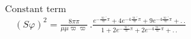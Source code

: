 \[
\begin{gathered}\text{Constant term}\quad
\\[7pt]\quad{}(S\varphi)^{2}=\frac{8\pi\pi}{\mu\mu\varpi\varpi}\,.
\frac{e^{-\frac{\varpi'}{\varpi}\pi}+4e^{-4\frac{\varpi'}{\varpi}\pi}+9e^{-4\frac{\varpi'}{\varpi}\pi}+ .\,.}
{1+2e^{-\frac{\varpi'}{\varpi}\pi}+2e^{-4\frac{\varpi'}{\varpi}\pi}+ .\,.}\end{gathered}
\]
\clearpage
\endgroup
